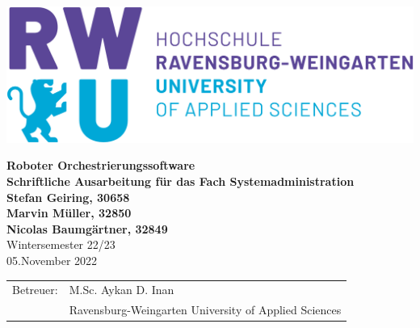 \pagestyle{empty}



\begin{center}


\vspace*{2cm}
\includegraphics[scale=0.15]{imgs/rwu_logo.png}
\vspace*{3cm}

\huge
\textbf{Roboter Orchestrierungssoftware}\\
\Large
\vspace*{2cm}
\noindent \textbf{Schriftliche Ausarbeitung für das Fach Systemadministration}\\
\vspace*{0.5cm}
\noindent \textbf{Stefan Geiring, 30658}\\
\noindent \textbf{Marvin Müller, 32850}\\
\noindent \textbf{Nicolas Baumgärtner, 32849}\\
\vspace*{0.5cm}
Wintersemester 22/23\\
\normalsize 
05.November 2022
\vspace*{2cm}
\end{center}


\vspace*{4.5cm}
\begin{tabular}{ll}
Betreuer: & M.Sc. Aykan D. Inan \\
 & Ravensburg-Weingarten University of Applied Sciences\\
\end{tabular}

